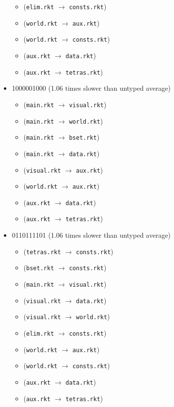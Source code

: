 \documentclass{article}
\newcommand{\mono}[1]{\texttt{#1}}
\begin{document}
\begin{itemize}
\begin{itemize}
  \item (\mono{elim.rkt} $\rightarrow$ \mono{consts.rkt})
  \item (\mono{world.rkt} $\rightarrow$ \mono{aux.rkt})
  \item (\mono{world.rkt} $\rightarrow$ \mono{consts.rkt})
  \item (\mono{aux.rkt} $\rightarrow$ \mono{data.rkt})
  \item (\mono{aux.rkt} $\rightarrow$ \mono{tetras.rkt})
  \end{itemize}
\item 1000001000 (1.06 times slower than untyped average)
  \begin{itemize}
  \item (\mono{main.rkt} $\rightarrow$ \mono{visual.rkt})
  \item (\mono{main.rkt} $\rightarrow$ \mono{world.rkt})
  \item (\mono{main.rkt} $\rightarrow$ \mono{bset.rkt})
  \item (\mono{main.rkt} $\rightarrow$ \mono{data.rkt})
  \item (\mono{visual.rkt} $\rightarrow$ \mono{aux.rkt})
  \item (\mono{world.rkt} $\rightarrow$ \mono{aux.rkt})
  \item (\mono{aux.rkt} $\rightarrow$ \mono{data.rkt})
  \item (\mono{aux.rkt} $\rightarrow$ \mono{tetras.rkt})
  \end{itemize}
\item 0110111101 (1.06 times slower than untyped average)
  \begin{itemize}
  \item (\mono{tetras.rkt} $\rightarrow$ \mono{consts.rkt})
  \item (\mono{bset.rkt} $\rightarrow$ \mono{consts.rkt})
  \item (\mono{main.rkt} $\rightarrow$ \mono{visual.rkt})
  \item (\mono{visual.rkt} $\rightarrow$ \mono{data.rkt})
  \item (\mono{visual.rkt} $\rightarrow$ \mono{world.rkt})
  \item (\mono{elim.rkt} $\rightarrow$ \mono{consts.rkt})
  \item (\mono{world.rkt} $\rightarrow$ \mono{aux.rkt})
  \item (\mono{world.rkt} $\rightarrow$ \mono{consts.rkt})
  \item (\mono{aux.rkt} $\rightarrow$ \mono{data.rkt})
  \item (\mono{aux.rkt} $\rightarrow$ \mono{tetras.rkt})

\end{itemize}
\end{itemize}
\end{document}
